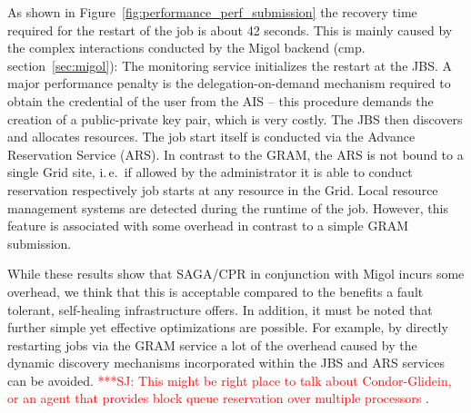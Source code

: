 \documentclass[times, 10pt, twocolumn]{article}
\newcommand{\jhanote}[1]{ {\textcolor{red} { ***SJ: #1 }}}
\newcommand{\jhanote}[1]{}
\begin{document}
As shown in Figure~\ref{fig:performance_perf_submission} the recovery
time required for the restart of the job is about 42 seconds. This is
mainly caused by the complex interactions conducted by the Migol
backend (cmp. section~\ref{sec:migol}): The monitoring service
initializes the restart at the JBS.  A major performance penalty is
the delegation-on-demand mechanism required to obtain the credential
of the user from the AIS -- this procedure demands the creation of a
public-private key pair, which is very costly. The JBS then discovers
and allocates resources.  The job start itself is conducted via the
Advance Reservation Service (ARS). In contrast to the GRAM, the ARS is
not bound to a single Grid site, i.\,e.\ if allowed by the
administrator it is able to conduct reservation respectively job
starts at any resource in the Grid. Local resource management systems
are detected during the runtime of the job. However, this feature is
associated with some overhead in contrast to a simple GRAM submission.



While these results show that SAGA/CPR in conjunction with Migol
incurs some overhead, we think that this is acceptable compared to the
benefits a fault tolerant, self-healing infrastructure offers. In
addition, it must be noted that further simple yet effective
optimizations are possible. For example, by directly restarting jobs
via the GRAM service a lot of the overhead caused by the dynamic
discovery mechanisms incorporated within the JBS and ARS services can
be avoided. \jhanote{This might be right place to talk about
  Condor-Glidein, or an agent that provides block queue reservation
  over multiple processors}.
\end{document}
